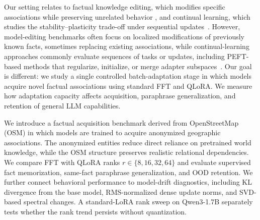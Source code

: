 \documentclass[11pt]{article}
\begin{document}


Our setting relates to factual knowledge editing, which modifies specific
associations while preserving unrelated behavior
\citep{meng2022locating,mitchell2022fast,meng2023mass,yang2025finetuning}, and
continual learning, which studies the stability--plasticity trade-off under
sequential updates~\citep{jang2022towards,shi-etal-2025-continual}. However,
model-editing benchmarks often focus on localized modifications of previously
known facts, sometimes replacing existing associations, while continual-learning
approaches commonly evaluate sequences of tasks or
updates, including PEFT-based methods that regularize, initialize, or merge
adapter subspaces~\citep{lu-etal-2025-controlled,qiao2026merge}. Our goal is
different: we study a single controlled batch-adaptation stage in which models
acquire novel factual associations using standard FFT and QLoRA. We measure how
adaptation capacity affects acquisition,
paraphrase generalization, and retention of general LLM capabilities.

We introduce a factual acquisition benchmark derived from OpenStreetMap (OSM) in which
models are trained to acquire anonymized geographic associations.
The anonymized entities reduce direct reliance on pretrained world
knowledge, while the OSM structure preserves realistic relational dependencies.
We compare FFT with QLoRA ranks $r \in \{8,16,32,64\}$ and evaluate supervised
fact memorization, same-fact paraphrase generalization, and OOD
retention. We further connect behavioral performance to model-drift diagnostics,
including KL divergence from the base model, RMS-normalized dense update norms,
and SVD-based spectral changes. A standard-LoRA rank sweep on Qwen3-1.7B
separately tests whether the rank trend persists without quantization.
\end{document}
